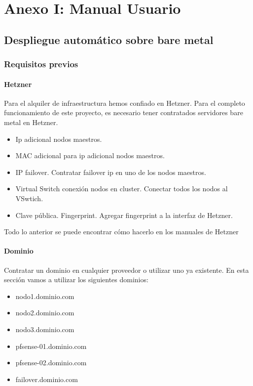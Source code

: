 \chapter {Anexo I: Manual Usuario}
	\section{Despliegue automático sobre bare metal}
		\subsection{Requisitos previos}
			\subsubsection{Hetzner}
				\begin{paragraph}
					Para el alquiler de infraestructura hemos confiado en Hetzner. Para el completo funcionamiento de este proyecto, es necesario tener contratados servidores bare metal en Hetzner. 
						\begin{itemize}
							\item Ip adicional nodos maestros.
							\item MAC adicional para ip adicional nodos maestros.
							\item IP failover. Contratar failover ip en uno de los nodos maestros.
							\item Virtual Switch conexión nodos en cluster. Conectar todos los nodos al VSwtich.
							\item Clave pública. Fingerprint. Agregar fingerprint a la interfaz de Hetzner.
						\end{itemize}	
					Todo lo anterior se puede encontrar cómo hacerlo en los manuales de Hetzner \cite{hetznerdocs:online}
				\end{paragraph}
			\subsubsection{Dominio}
				\begin{paragraph}
					Contratar un dominio en cualquier proveedor o utilizar uno ya existente. En esta sección vamos a utilizar los siguientes dominios:
					\begin{itemize}
						\item nodo1.dominio.com
						\item nodo2.dominio.com 
						\item nodo3.dominio.com
						\item pfsense-01.dominio.com
						\item pfsense-02.dominio.com
						\item failover.dominio.com
					\end{itemize}
				\end{paragraph}
